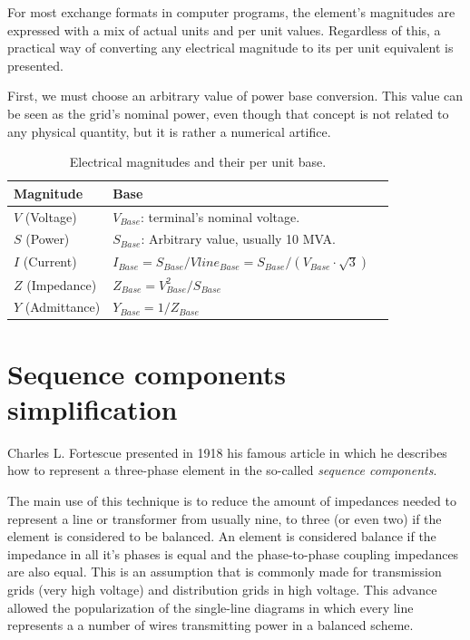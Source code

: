 \documentclass[nols,a4paper,twoside,notoc,fleqn]{tufte-book}
\begin{document}
For most exchange formats in computer programs, the element's magnitudes are expressed with a mix of actual units and per unit values. Regardless of this, a practical way of converting any electrical magnitude to its per unit equivalent is presented.

First, we must choose an arbitrary value of power base conversion. This value can be seen as the grid's nominal power, even though that concept is not related to any physical quantity, but it is rather a numerical artifice. 





\bigskip
\begin{table}[h!]
\begin{center}
\footnotesize
\begin{tabular}{lll}
\toprule
Magnitude &  Base\\
\midrule
$V$ (Voltage) & $V_{Base}$: terminal's nominal voltage. \\
$S$ (Power) & $S_{Base}$: Arbitrary value, usually 10 MVA. \\
$I$ (Current) & $I_{Base} = S_{Base} / Vline_{Base} = S_{Base} / (V_{Base} \cdot \sqrt{3})$ \\
$Z$ (Impedance) & $Z_{Base} = V_{Base}^2 / S_{Base}$ \\
$Y$ (Admittance) & $Y_{Base} = 1 / Z_{Base}$ \\
\bottomrule
\end{tabular}
\end{center}
  \caption{Electrical magnitudes and their per unit base.}
  \label{magnitudes_and_their_base}
\end{table}


\section{Sequence components simplification}

Charles L. Fortescue presented in 1918 his famous article \cite{fortescue1918method} in which he describes how to represent a three-phase element in the so-called \textit{sequence components}.

The main use of this technique is to reduce the amount of impedances needed to represent a line or transformer from usually nine, to three (or even two) if the element is considered to be balanced. An element is considered balance if the impedance in all it's phases is equal and the phase-to-phase coupling impedances are also equal. This is an assumption that is commonly made for transmission grids (very high voltage) and distribution grids in high voltage. This advance allowed the popularization of the single-line diagrams in which every line represents a  a number of wires transmitting power in a balanced scheme.
\end{document}
